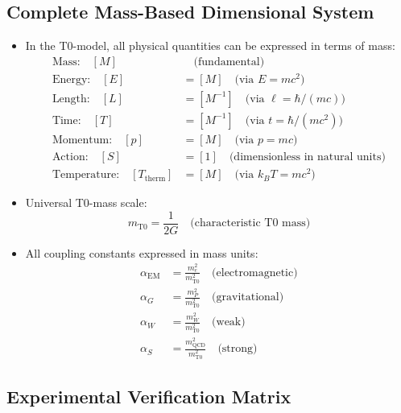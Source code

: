 \documentclass[12pt,a4paper]{article}
\begin{document}
\subsection{Complete Mass-Based Dimensional System}
\begin{itemize}
	\item In the T0-model, all physical quantities can be expressed in terms of mass:
	\begin{align}
		\text{Mass:} \quad [M] &\quad \text{(fundamental)} \\
		\text{Energy:} \quad [E] &= [M] \quad \text{(via } E = mc^2 \text{)} \\
		\text{Length:} \quad [L] &= [M^{-1}] \quad \text{(via } \ell = \hbar/(mc) \text{)} \\
		\text{Time:} \quad [T] &= [M^{-1}] \quad \text{(via } t = \hbar/(mc^2) \text{)} \\
		\text{Momentum:} \quad [p] &= [M] \quad \text{(via } p = mc \text{)} \\
		\text{Action:} \quad [S] &= [1] \quad \text{(dimensionless in natural units)} \\
		\text{Temperature:} \quad [T_{\text{therm}}] &= [M] \quad \text{(via } k_B T = mc^2 \text{)}
	\end{align}
	
	\item Universal T0-mass scale:
	\begin{equation}
		m_{\text{T0}} = \frac{1}{2G} \quad \text{(characteristic T0 mass)}
	\end{equation}
	
	\item All coupling constants expressed in mass units:
	\begin{align}
		\alpha_{\text{EM}} &= \frac{m_e^2}{m_{\text{T0}}^2} \quad \text{(electromagnetic)} \\
		\alpha_G &= \frac{m_P^2}{m_{\text{T0}}^2} \quad \text{(gravitational)} \\
		\alpha_W &= \frac{m_W^2}{m_{\text{T0}}^2} \quad \text{(weak)} \\
		\alpha_S &= \frac{m_{\text{QCD}}^2}{m_{\text{T0}}^2} \quad \text{(strong)}
	\end{align}
\end{itemize}	
	\subsection{Experimental Verification Matrix}
	
\end{document}
